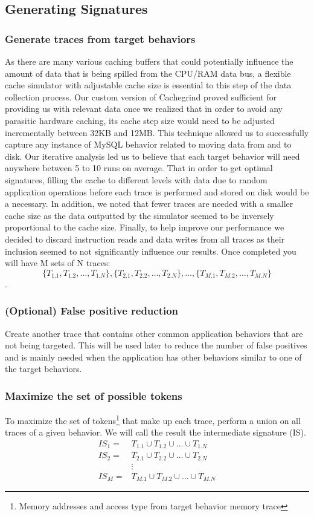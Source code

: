 \documentclass[11pt, oneside]{article}
\begin{document}
\subsection{Generating Signatures}
\subsubsection{Generate traces from target behaviors}
As there are many various caching buffers that could potentially influence the 
amount of data that is being spilled from the CPU/RAM data bus, a flexible 
cache simulator with adjustable cache size is essential to this step of the 
data collection process. Our custom version of Cachegrind proved sufficient 
for providing us with relevant data once we realized that in order to avoid 
any parasitic hardware caching, its cache step size would need to be adjusted 
incrementally between 32KB and 12MB. This technique allowed us to successfully 
capture any instance of MySQL behavior related to moving data from and to 
disk.  Our iterative analysis led us to believe that each target behavior will 
need anywhere between 5 to 10 runs on average. That in order to get optimal 
signatures, filling the cache to different levels with data due to random 
application operations before each trace is performed and stored on disk would 
be a necessary. In addition, we noted that fewer traces are needed with a 
smaller cache size as the data outputted by the simulator seemed to be 
inversely proportional to the cache size. Finally, to help improve our 
performance we decided to discard instruction reads and data writes from all 
traces as their inclusion seemed to not significantly influence our results.
Once completed you will have M sets of N traces:
$$\{T_{1.1}, T_{1.2}, \ldots, T_{1.N}\}, 
  \{T_{2.1}, T_{2.2}, \ldots, T_{2.N}\},
  \ldots,
  \{T_{M.1}, T_{M.2}, \ldots, T_{M.N}\}$$.

\subsubsection{(Optional) False positive reduction}
Create another trace that contains other common application behaviors that are 
not being targeted. This will be used later to reduce the number of false 
positives and is mainly needed when the application has other behaviors 
similar to one of the target behaviors.

\subsubsection{Maximize the set of possible tokens}
To maximize the set of tokens\footnote{Memory addresses and access type from 
target behavior memory trace} that make up each trace, perform a union on all 
traces of a given behavior.  We will call the result the intermediate 
signature (IS).
\begin{align*}
IS_1 =& T_{1.1}\cup T_{1.2}\cup\ldots\cup T_{1.N} \\
IS_2 =& T_{2.1}\cup T_{2.2}\cup\ldots\cup T_{2.N} \\
      &\vdots \\
IS_M =& T_{M.1}\cup T_{M.2}\cup\ldots\cup T_{M.N}
\end{align*}
\end{document}
